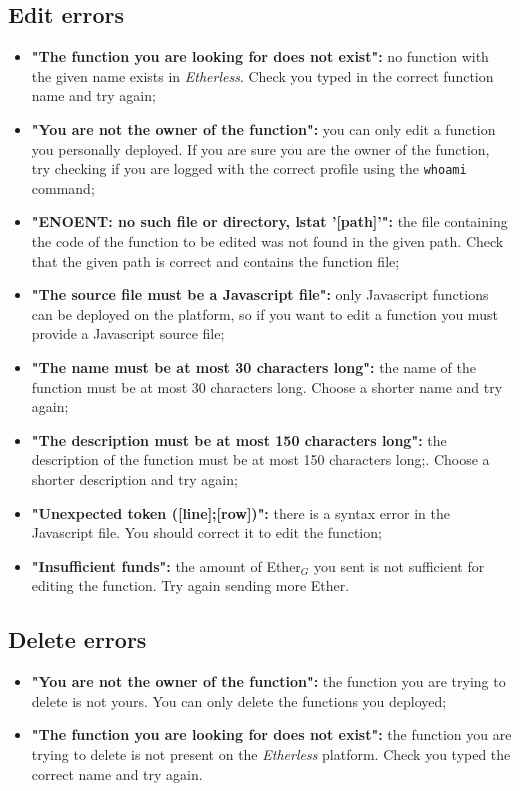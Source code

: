   \subsection{Edit errors}
  \begin{itemize}
   \item \textbf{"The function you are looking for does not exist":} no function with the given name exists in \textit{Etherless}. Check you typed in the correct function name and try again;
    \item \textbf{"You are not the owner of the function":} you can only edit a function you personally deployed. If you are sure you are the owner of the function, try checking if you are logged with the correct profile using the \texttt{whoami} command;
    \item \textbf{"ENOENT: no such file or directory, lstat '[path]'":} the file containing the code of the function to be edited was not found in the given path. Check that the given path is correct and contains the function file;
     \item \textbf{"The source file must be a Javascript file":} only Javascript functions can be deployed on the platform, so if you want to edit a function you must provide a Javascript source file;
    \item \textbf{"The name must be at most 30 characters long":} the name of the function must be at most 30 characters long. Choose a shorter name and try again;
    \item \textbf{"The description must be at most 150 characters long":} the description of the function must be at most 150 characters long;. Choose a shorter description and try again;
    \item \textbf{"Unexpected token ([line];[row])":} there is a syntax error in the Javascript file. You should correct it to edit the function; 
    \item \textbf{"Insufficient funds":} the amount of Ether$_{G}$ you sent is not sufficient for editing the function. Try again sending more Ether.
  \end{itemize}
  
  \subsection{Delete errors}
  \begin{itemize}
    \item \textbf{"You are not the owner of the function":} the function you are trying to delete is not yours. You can only delete the functions you deployed;
    \item \textbf{"The function you are looking for does not exist":} the function you are trying to delete is not present on the \textit{Etherless} platform. Check you typed the correct name and try again.
  \end{itemize}
  
